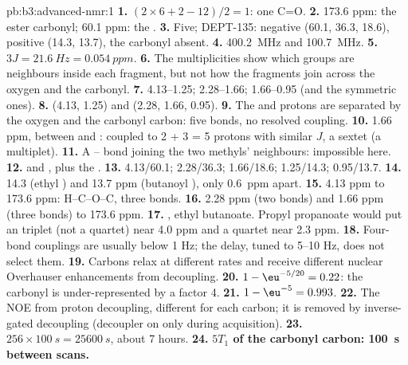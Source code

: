\begin{solution}{pb:b3:advanced-nmr:1}
\textbf{1.} $(2 \times 6 + 2 - 12)/2 = 1$: one C=O.
\textbf{2.} 173.6 ppm: the ester carbonyl; 60.1 ppm: the .
\textbf{3.} Five; DEPT-135:  negative (60.1, 36.3, 18.6),  positive (14.3,
13.7), the carbonyl absent.
\textbf{4.} \qty{400.2}{MHz} and \qty{100.7}{MHz}.
\textbf{5.} $3J = \qty{21.6}{Hz} = \qty{0.054}{ppm}$.
\textbf{6.} The multiplicities show which groups are neighbours inside each
fragment, but not how the fragments join across the oxygen and the carbonyl.
\textbf{7.} 4.13--1.25; 2.28--1.66; 1.66--0.95 (and the symmetric ones).
\textbf{8.}  (4.13, 1.25) and  (2.28, 1.66, 0.95).
\textbf{9.} The  and  protons are separated by the oxygen and the
carbonyl carbon: five bonds, no resolved coupling.
\textbf{10.} 1.66 ppm, between  and : coupled to 2 + 3 = 5 protons with
similar $J$, a sextet (a multiplet).
\textbf{11.} A -- bond joining the two methyls' neighbours: impossible here.
\textbf{12.}  and , plus the .
\textbf{13.} 4.13/60.1; 2.28/36.3; 1.66/18.6; 1.25/14.3; 0.95/13.7.
\textbf{14.} 14.3 (ethyl ) and 13.7 ppm (butanoyl ), only \qty{0.6}{ppm} apart.
\textbf{15.} 4.13 ppm to 173.6 ppm: H--C--O--C, three bonds.
\textbf{16.} 2.28 ppm (two bonds) and 1.66 ppm (three bonds) to 173.6 ppm.
\textbf{17.} , ethyl butanoate. Propyl propanoate would put an
 triplet (not a quartet) near 4.0 ppm and a quartet near 2.3 ppm.
\textbf{18.} Four-bond couplings are usually below 1 Hz; the  delay, tuned to
5--10 Hz, does not select them.
\textbf{19.} Carbons relax at different rates and receive different nuclear
Overhauser enhancements from decoupling.
\textbf{20.} $1 - \eu^{-5/20} = 0.22$: the carbonyl is under-represented by a factor 4.
\textbf{21.} $1 - \eu^{-5} = 0.993$.
\textbf{22.} The NOE from proton decoupling, different for each carbon; it is removed
by inverse-gated decoupling (decoupler on only during acquisition).
\textbf{23.} $256 \times \qty{100}{s} = \qty{25600}{s}$, about 7 hours.
\textbf{24.} \textbf{$5T_1$ of the carbonyl carbon: \qty{100}{s} between scans.}
\end{solution}
